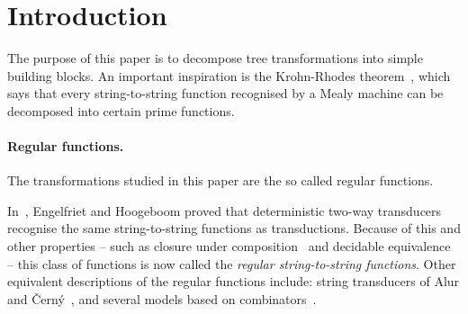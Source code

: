 
\section{Introduction}

The purpose of this paper is to decompose tree transformations into simple building blocks. An important inspiration  is the Krohn-Rhodes theorem~\cite[p.~454]{Krohn1965}, which says that every string-to-string function recognised by a Mealy machine can be decomposed into certain prime functions. 

\paragraph*{Regular functions.} The transformations studied in this paper are the so called  regular functions.

In~\cite[Theorem 13]{engelfrietMSODefinableString2001}, Engelfriet and Hoogeboom proved that deterministic two-way transducers recognise the same string-to-string functions as \mso transductions. Because of this and other properties -- such as closure under composition~\cite[Theorem 1]{chytilSerialComposition2Way1977} and decidable equivalence~\cite[Theorem 1]{gurariEquivalenceProblemDeterministic1982} --  this class of functions is now called the \emph{regular string-to-string functions}. Other  equivalent descriptions of the regular functions include: string transducers of Alur and {\v C}ern{\'y}~\cite{alurExpressivenessStreamingString2010}, and several models based on combinators~\cite{alur2014regular,daveGastinKrishna18, bojanczykRegularFirstOrderList2018}. 
 

